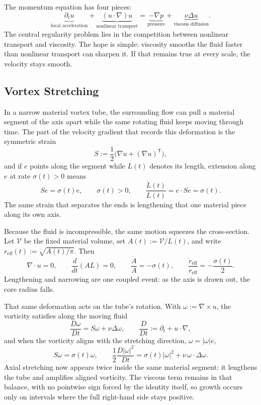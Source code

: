 
The momentum equation has four pieces:
\[
  \underbrace{\partial_t u}_{\text{local acceleration}}
  +
  \underbrace{(u\cdot\nabla)u}_{\text{nonlinear transport}}
  =
  \underbrace{-\nabla p}_{\text{pressure}}
  +
  \underbrace{\nu\Delta u}_{\text{viscous diffusion}}.
\]
The central regularity problem lies in the competition between nonlinear transport and viscosity.
The hope is simple: viscosity smooths the fluid faster than nonlinear transport can sharpen it.
If that remains true at every scale, the velocity stays smooth.

\subsection{Vortex Stretching}\label{sub:ThePerfectlyStretchingVortex}

In a narrow material vortex tube, the surrounding flow can pull a material segment of the axis apart while the same rotating fluid keeps moving through time.
The part of the velocity gradient that records this deformation is the symmetric strain
\[
  S:=\frac12\bigl(\nabla u+(\nabla u)^{\mathsf T}\bigr),
\]
and if \(e\) points along the segment while \(L(t)\) denotes its length, extension along \(e\) at rate \(\sigma(t)>0\) means
\[
  Se=\sigma(t)e,
  \qquad
  \sigma(t)>0,
  \qquad
  \frac{\dot L(t)}{L(t)}
  =
  e\cdot Se
  =
  \sigma(t).
\]
The same strain that separates the ends is lengthening that one material piece along its own axis.

Because the fluid is incompressible, the same motion squeezes the cross-section.
Let \(\mathcal V\) be the fixed material volume, set \(A(t):=\mathcal V/L(t)\), and write \(r_{\mathrm{eff}}(t):=\sqrt{A(t)/\pi}\).
Then
\[
  \nabla\cdot u=0,
  \qquad
  \frac{d}{dt}(A L)=0,
  \qquad
  \frac{\dot A}{A}=-\sigma(t),
  \qquad
  \frac{\dot r_{\mathrm{eff}}}{r_{\mathrm{eff}}}
  =
  -\frac{\sigma(t)}{2}.
\]
Lengthening and narrowing are one coupled event: as the axis is drawn out, the core radius falls.

That same deformation acts on the tube's rotation.
With \(\omega:=\nabla\times u\), the vorticity satisfies along the moving fluid
\[
  \frac{D\omega}{Dt}
  =
  S\omega+\nu\Delta\omega,
  \qquad
  \frac{D}{Dt}
  :=
  \partial_t+u\cdot\nabla,
\]
and when the vorticity aligns with the stretching direction, \(\omega=|\omega|e\),
\[
  S\omega
  =
  \sigma(t)\omega,
  \qquad
  \frac12\frac{D|\omega|^2}{Dt}
  =
  \sigma(t)|\omega|^2
  +
  \nu\,\omega\cdot\Delta\omega.
\]
Axial stretching now appears twice inside the same material segment: it lengthens the tube and amplifies aligned vorticity.
The viscous term remains in that balance, with no pointwise sign forced by the identity itself, so growth occurs only on intervals where the full right-hand side stays positive.

